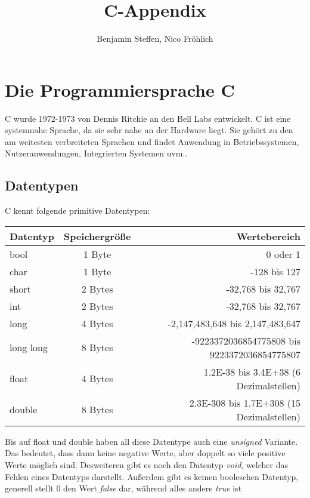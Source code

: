 \documentclass{article}
\begin{document}
\title{C-Appendix}
\author{Benjamin Steffen, Nico Fröhlich}
\maketitle
\clearpage

\tableofcontents

\newpage

\section{Die Programmiersprache C}
C wurde 1972-1973 von Dennis Ritchie an den Bell Labs entwickelt. C ist eine systemnahe Sprache, da sie sehr nahe an der Hardware liegt. Sie gehört zu den am weitesten verbreiteten Sprachen und findet Anwendung in Betriebssystemen,
Nutzeranwendungen,  Integrierten Systemen uvm..

\subsection{Datentypen}
C kennt folgende primitive Datentypen:
\begin{center}
\begin{tabular}{| l | c | r |}
	\hline
	\textbf{Datentyp} & \textbf{Speichergr{\"o}{\ss}e} & \textbf{Wertebereich} \\ \hline
    bool & 1 Byte & 0 oder 1 \\
	char & 1 Byte & -128 bis 127 \\
	short & 2 Bytes & -32,768 bis 32,767 \\
	int & 2 Bytes &  -32,768 bis 32,767 \\
	long & 4 Bytes & -2,147,483,648 bis 2,147,483,647 \\
	long long & 8 Bytes & -9223372036854775808 bis 9223372036854775807 \\
	float & 4 Bytes & 1.2E-38 bis 3.4E+38 (6 Dezimalstellen) \\
	double & 8 Bytes & 2.3E-308 bis 1.7E+308 (15 Dezimalstellen) \\
	\hline
\end{tabular}
\end{center}
Bis auf float und double haben all diese Datentype auch eine \textit{unsigned} Variante. Das bedeutet, dass dann keine negative Werte, aber doppelt so viele positive Werte möglich sind. Desweiteren gibt es noch den Datentyp \textit{void}, welcher das Fehlen eines Datentyps darstellt.
Außerdem gibt es keinen booleschen Datentyp, generell stellt 0 den Wert \textit{false} dar, während alles andere \textit{true} ist
\end{document}
